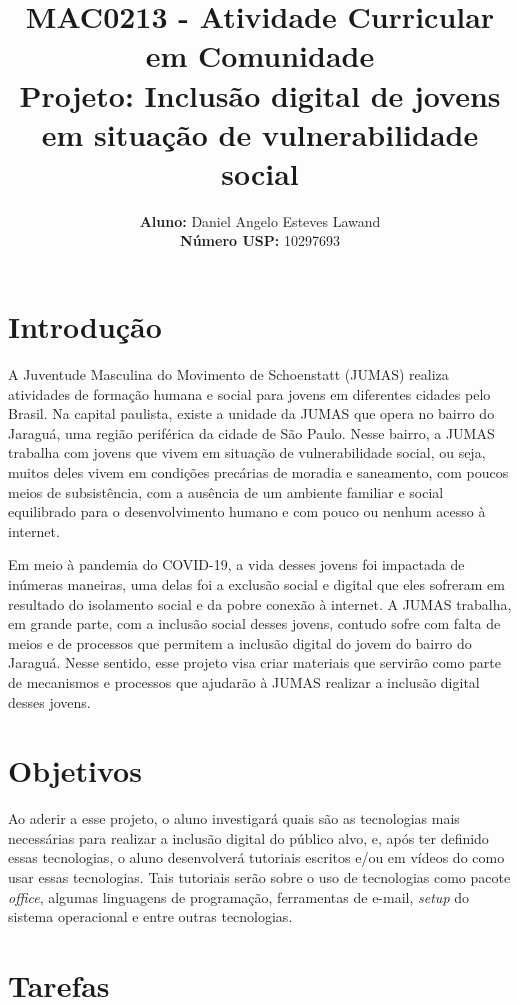 \documentclass{article}
\title{\textbf{MAC0213 - Atividade Curricular em Comunidade \\ Projeto: Inclusão digital de jovens em situação de vulnerabilidade social}}
\author{
    \textbf{Aluno:} Daniel Angelo Esteves Lawand  \\
    \textbf{Número USP:} 10297693
    }
\date{}
\begin{document}
\maketitle

\section{Introdução}

A Juventude Masculina do Movimento de Schoenstatt (JUMAS) realiza atividades de formação humana e social para jovens em diferentes cidades pelo Brasil. Na capital paulista, existe a unidade da JUMAS que opera no bairro do Jaraguá, uma região periférica da cidade de São Paulo. Nesse bairro, a JUMAS trabalha com jovens que vivem em situação de vulnerabilidade social, ou seja, muitos deles vivem em condições precárias de moradia e saneamento, com poucos meios de subsistência, com a ausência de um ambiente familiar e social equilibrado para o desenvolvimento humano e com pouco ou nenhum acesso à internet.

Em meio à pandemia do COVID-19, a vida desses jovens foi impactada de inúmeras maneiras, uma delas foi a exclusão social e digital que eles sofreram em resultado do isolamento social e da pobre conexão à internet. A JUMAS trabalha, em grande parte, com a inclusão social desses jovens, contudo sofre com falta de meios e de processos que permitem a inclusão digital do jovem do bairro do Jaraguá. Nesse sentido, esse projeto visa criar materiais que servirão como parte de mecanismos e processos que ajudarão à JUMAS realizar a inclusão digital desses jovens.

\section{Objetivos}

Ao aderir a esse projeto, o aluno investigará quais são as tecnologias mais necessárias para realizar a inclusão digital do público alvo, e, após ter definido essas tecnologias, o aluno desenvolverá tutoriais escritos e/ou em vídeos do como usar essas tecnologias. Tais tutoriais serão sobre o uso de tecnologias como pacote \textit{office}, algumas linguagens de programação, ferramentas de e-mail, \textit{setup} do sistema operacional e entre outras tecnologias. 

\section{Tarefas}
\end{document}
